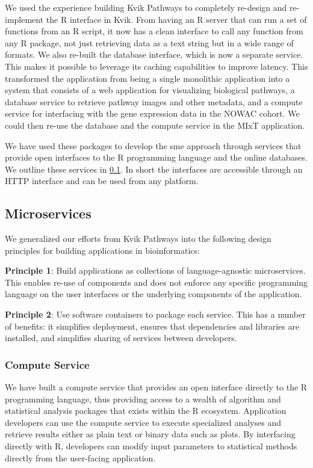 We used the experience building Kvik Pathways to completely re-design and
re-implement the R interface in Kvik. From having an R server that can run a
set of functions from an R script, it now has a clean interface to call any
function from any R package, not just retrieving data as a text string but in a
wide range of formats. We also re-built the database interface, which is now a
separate service. This makes it possible to leverage its caching capabilities
to improve latency. This transformed the application from being a single
monolithic application into a system that consists of a web application for
visualizing biological pathways, a database service to retrieve pathway images
and other metadata, and a compute service for interfacing with the gene
expression data in the NOWAC cohort. We could then re-use the database and the
compute service in the MIxT application. 

We have used these packages to develop the \gls{sme} approach through services
that provide open interfaces to the R programming language and the online
databases.  We outline these services in \ref{micrservices}.  In short the
interfaces are accessible through an HTTP interface and can be used from any
platform.

\subsection{Microservices}\label{micrservices} 
We generalized our efforts from Kvik Pathways into the following design
principles for building applications in bioinformatics: 

\textbf{Principle 1}: Build applications as collections of language-agnostic
microservices. This enables re-use of components and does not enforce any
specific programming language on the user interfaces or the underlying
components of the application. 

\textbf{Principle 2}: Use software containers to package each service. This has
a number of benefits: it simplifies deployment, ensures that dependencies and
libraries are installed, and  simplifies sharing of services between
developers. 

\subsubsection{Compute Service}
We have built a compute service that provides an open interface directly to the
R programming language, thus providing access to a wealth of algorithm and
statistical analysis packages that exists within the R ecosystem.  
Application developers can use the compute service to execute specialized
analyses and retrieve results either as plain text or binary data such as plots.
By interfacing directly with R, developers can modify input parameters to
statistical methods directly from the user-facing application. 

